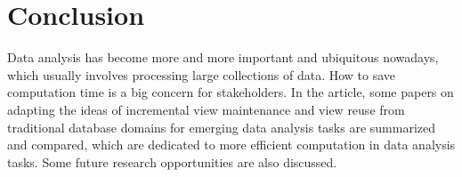 \section{Conclusion}
Data analysis has become more and more important and ubiquitous nowadays, which usually involves processing large collections of data. How to save computation time is a big concern for stakeholders. In the article, some papers on adapting the ideas of incremental view maintenance and view reuse from traditional database domains for emerging data analysis tasks are summarized and compared, which are dedicated to more efficient computation in data analysis tasks. Some future research opportunities are also discussed.